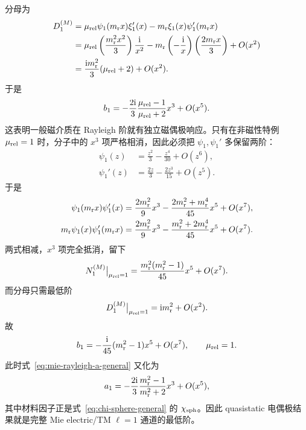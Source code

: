 分母为
\begin{align}
D_1^{(M)}
&=\mu_{\rm rel}\psi_1(m_{\rm r}x)\xi_1'(x)
-m_{\rm r}\xi_1(x)\psi_1'(m_{\rm r}x)\\
&=\mu_{\rm rel}
\left(\frac{m_{\rm r}^2x^2}{3}\right)
\frac{\mathrm{i}}{x^2}
-m_{\rm r}
\left(-\frac{\mathrm{i}}{x}\right)
\left(\frac{2m_{\rm r}x}{3}\right)
+O(x^2)\\
&=\frac{\mathrm{i} m_{\rm r}^2}{3}(\mu_{\rm rel}+2)+O(x^2).
\end{align}
于是
\begin{equation}
{
b_1
=-\frac{2\mathrm{i}}{3}
\frac{\mu_{\rm rel}-1}
{\mu_{\rm rel}+2}x^3
+O(x^5).}
\label{eq:mie-rayleigh-b-general}
\end{equation}
这表明一般磁介质在 Rayleigh 阶就有独立磁偶极响应。只有在非磁性特例 $\mu_{\rm rel}=1$ 时，分子中的 $x^3$ 项严格相消，因此必须把 $\psi_1,\psi_1'$ 多保留两阶：
\begin{align}
\psi_1(z)&=\frac{z^2}{3}-\frac{z^4}{30}+O(z^6),\\
\psi_1'(z)&=\frac{2z}{3}-\frac{2z^3}{15}+O(z^5).
\end{align}
于是
\begin{align}
\psi_1(m_{\rm r}x)\psi_1'(x)
&=\frac{2m_{\rm r}^2}{9}x^3
-\frac{2m_{\rm r}^2+m_{\rm r}^4}{45}x^5+O(x^7),\\
m_{\rm r}\psi_1(x)\psi_1'(m_{\rm r}x)
&=\frac{2m_{\rm r}^2}{9}x^3
-\frac{m_{\rm r}^2+2m_{\rm r}^4}{45}x^5+O(x^7).
\end{align}
两式相减，$x^3$ 项完全抵消，留下
\begin{equation}
N_1^{(M)}\big|_{\mu_{\rm rel}=1}
=\frac{m_{\rm r}^2(m_{\rm r}^2-1)}{45}x^5+O(x^7).
\end{equation}
而分母只需最低阶
\begin{equation}
D_1^{(M)}\big|_{\mu_{\rm rel}=1}
=\mathrm{i} m_{\rm r}^2+O(x^2).
\end{equation}
故
\begin{equation}
{
b_1
=-\frac{\mathrm{i}}{45}
(m_{\rm r}^2-1)x^5+O(x^7),
\qquad
\mu_{\rm rel}=1.}
\label{eq:mie-rayleigh-b-nonmagnetic}
\end{equation}
此时式~\cref{eq:mie-rayleigh-a-general} 又化为
\begin{equation}
a_1
=-\frac{2\mathrm{i}}{3}
\frac{m_{\rm r}^2-1}{m_{\rm r}^2+2}x^3+O(x^5),
\end{equation}
其中材料因子正是式~\cref{eq:chi-sphere-general} 的
$\chi_{\rm sph}$。因此 quasistatic 电偶极结果就是完整 Mie electric/TM $\ell=1$ 通道的最低阶。


